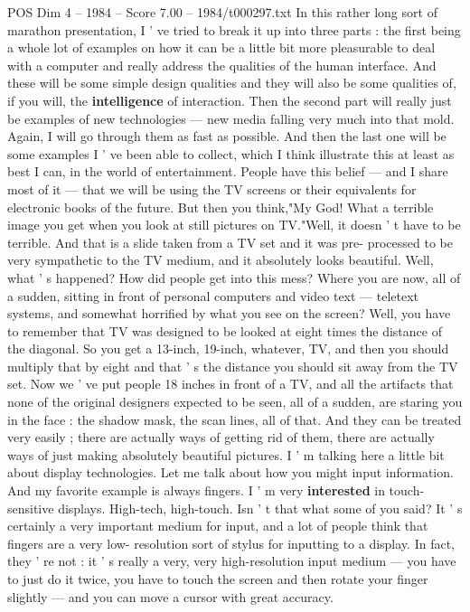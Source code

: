 \begin{textsample}{POS Dim 4 – 1984 – Score 7.00 – 1984/t000297.txt}  \label{ex:f4_pos_039}
In this rather long sort of marathon presentation, I ' ve tried to break it up into three parts : the first being a whole lot of examples on how it can be a little bit more pleasurable to deal with a computer and really address the qualities of the human interface.
And these will be some simple design qualities and they will also be some qualities of, if you will, the \textbf{intelligence} of interaction.
Then the second part will really just be examples of new technologies — new media falling very much into that mold.
Again, I will go through them as fast as possible.
And then the last one will be some examples I ' ve been able to collect, which I think illustrate this at least as best I can, in the world of entertainment.
People have this belief — and I share most of it — that we will be using the TV screens or their equivalents for electronic books of the future.
But then you think,"My God!
What a terrible image you get when you look at still pictures on TV."Well, it doesn ' t have to be terrible.
And that is a slide taken from a TV set and it was pre- processed to be very sympathetic to the TV medium, and it absolutely looks beautiful.
Well, what ' s happened?
How did people get into this mess?
Where you are now, all of a sudden, sitting in front of personal computers and video text — teletext systems, and somewhat horrified by what you see on the screen?
Well, you have to remember that TV was designed to be looked at eight times the distance of the diagonal.
So you get a 13-inch, 19-inch, whatever, TV, and then you should multiply that by eight and that ' s the distance you should sit away from the TV set.
Now we ' ve put people 18 inches in front of a TV, and all the artifacts that none of the original designers expected to be seen, all of a sudden, are staring you in the face : the shadow mask, the scan lines, all of that.
And they can be treated very easily ; there are actually ways of getting rid of them, there are actually ways of just making absolutely beautiful pictures.
I ' m talking here a little bit about display technologies.
Let me talk about how you might input information.
And my favorite example is always fingers.
I ' m very \textbf{interested} in touch-sensitive displays.
High-tech, high-touch.
Isn ' t that what some of you said?
It ' s certainly a very important medium for input, and a lot of people think that fingers are a very low- resolution sort of stylus for inputting to a display.
In fact, they ' re not : it ' s really a very, very high-resolution input medium — you have to just do it twice, you have to touch the screen and then rotate your finger slightly — and you can move a cursor with great accuracy.

\end{textsample}
